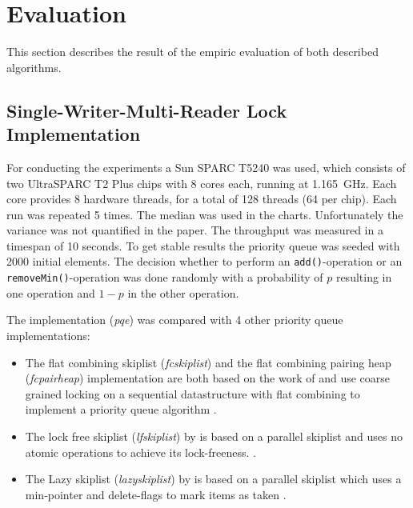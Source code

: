 
\section{Evaluation}

This section describes the result of the empiric evaluation of both described algorithms.

\subsection{Single-Writer-Multi-Reader Lock Implementation}

For conducting the experiments a Sun SPARC T5240 was used, which consists of two UltraSPARC T2 Plus chips with 8 cores each, running at 1.165~GHz. Each core provides 8 hardware threads, for a total of 128 threads (64 per chip). Each run was repeated 5 times. The median was used in the charts. Unfortunately the variance was not quantified in the paper. The throughput was measured in a timespan of 10 seconds. To get stable results the priority queue was seeded with 2000 initial elements. The decision whether to perform an \texttt{add()}-operation or an \texttt{removeMin()}-operation was done randomly with a probability of $p$ resulting in one operation and $1-p$ in the other operation.

The implementation (\textit{pqe}) was compared with 4 other priority queue implementations:
\begin{itemize}
	\item The flat combining skiplist (\textit{fcskiplist}) and the flat combining pairing heap (\textit{fcpairheap}) implementation are both based on the work of \citeauthor{hendler_flat_2010} and use coarse grained locking on a sequential datastructure with flat combining to implement a priority queue algorithm \cite{hendler_flat_2010}.
	\item The lock free skiplist (\textit{lfskiplist}) by \citeauthor{sundell_fast_2003} is based on a parallel skiplist and uses no atomic operations to achieve its lock-freeness. \cite{sundell_fast_2003}.
	\item The Lazy skiplist (\textit{lazyskiplist}) by \citeauthor{lotan_skiplist-based_2000} is based on a parallel skiplist which uses a min-pointer and delete-flags to mark items as taken \cite{lotan_skiplist-based_2000}.
\end{itemize}

